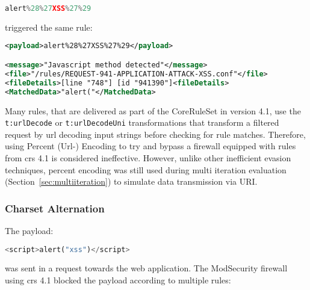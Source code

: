 \begin{lstlisting}[style=basicStyle, language=Python]
alert%28%27XSS%27%29
\end{lstlisting}
triggered the same rule:

\begin{lstlisting}[style=ruleStyle, language=XML, caption=Percent encoded alert('XSS') blocked, label={lst:urlencodedexampleblocked}]
<payload>alert%28%27XSS%27%29</payload>

<message>"Javascript method detected"</message>
<file>"/rules/REQUEST-941-APPLICATION-ATTACK-XSS.conf"</file>
<fileDetails>[line "748"] [id "941390"]<fileDetails>
<MatchedData>"alert("</MatchedData>
\end{lstlisting}
Many rules, that are delivered as part of the CoreRuleSet in version 4.1, use the \verb|t:urlDecode| or \verb|t:urlDecodeUni| transformations that transform a filtered request by url decoding input strings before checking for rule matches. Therefore, using Percent (Url-) Encoding to try and bypass a firewall equipped with rules from \acrshort{crs} 4.1 is considered ineffective. However, unlike other inefficient evasion techniques, percent encoding was still used during multi iteration evaluation (Section~\ref{sec:multiiteration}) to simulate data transmission via URI.  

\subsubsection{Charset Alternation}
\label{sec:charaltsingleiter}
The payload:

\begin{lstlisting}[style=basicStyle, language=Python]
<script>alert("xss")</script>
\end{lstlisting}
was sent in a request towards the web application. The ModSecurity firewall using \acrshort{crs} 4.1 blocked the payload according to multiple rules:

